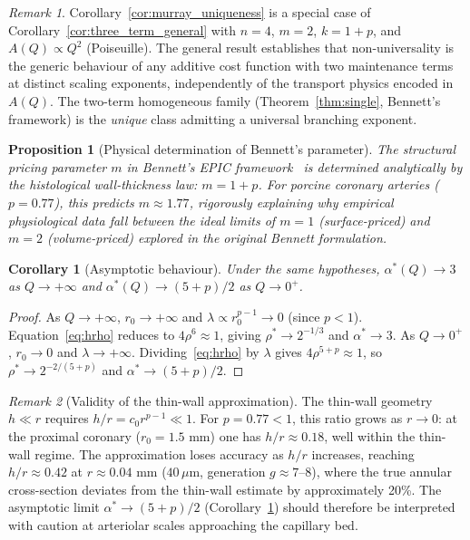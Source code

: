 \documentclass[11pt,a4paper]{article}
\newtheorem{corollary}[theorem]{Corollary}
\newtheorem{proposition}[theorem]{Proposition}
\theoremstyle{remark}
\newtheorem{remark}{Remark}
\begin{document}
\begin{remark}
Corollary~\ref{cor:murray_uniqueness} is a special case of
Corollary~\ref{cor:three_term_general} with $n=4$, $m=2$, $k=1+p$,
and $A(Q) \propto Q^2$ (Poiseuille). The general result establishes
that non-universality is the generic behaviour of any additive cost
function with two maintenance terms at distinct scaling exponents,
independently of the transport physics encoded in $A(Q)$. The
two-term homogeneous family (Theorem~\ref{thm:single}, Bennett's
framework) is the \emph{unique} class admitting a universal
branching exponent.
\end{remark}

\begin{proposition}[Physical determination of Bennett's parameter]
\label{prop:bennett}
The structural pricing parameter $m$ in Bennett's EPIC
framework~\cite{bennett2025} is determined analytically by the histological
wall-thickness law: $m = 1+p$. For porcine coronary arteries ($p=0.77$), this
predicts $m \approx 1.77$, rigorously explaining why empirical physiological
data fall between the ideal limits of $m=1$ (surface-priced) and $m=2$
(volume-priced) explored in the original Bennett formulation.
\end{proposition}

\begin{corollary}[Asymptotic behaviour]
\label{cor:asymp}
Under the same hypotheses, $\alpha^*(Q)\to 3$ as $Q\to+\infty$ and
$\alpha^*(Q)\to(5+p)/2$ as $Q\to 0^+$.
\end{corollary}

\begin{proof}
As $Q\to+\infty$, $r_0\to+\infty$ and $\lambda\propto r_0^{p-1}\to0$ (since
$p<1$).
Equation~\eqref{eq:hrho} reduces to $4\rho^6\approx1$, giving
$\rho^*\to2^{-1/3}$
and $\alpha^*\to3$.
As $Q\to0^+$, $r_0\to0$ and $\lambda\to+\infty$.
Dividing~\eqref{eq:hrho} by $\lambda$ gives $4\rho^{5+p}\approx1$,
so $\rho^*\to2^{-2/(5+p)}$ and $\alpha^*\to(5+p)/2$.
\end{proof}

\begin{remark}[Validity of the thin-wall approximation]
The thin-wall geometry $h \ll r$ requires $h/r = c_0 r^{p-1} \ll 1$.
For $p = 0.77 < 1$, this ratio grows as $r \to 0$: at the proximal
coronary ($r_0 = 1.5$ mm) one has $h/r \approx 0.18$, well within
the thin-wall regime. The approximation loses accuracy as $h/r$
increases, reaching $h/r \approx 0.42$ at $r \approx 0.04$ mm
($40\,\mu$m, generation $g \approx 7$--$8$), where the true annular
cross-section deviates from the thin-wall estimate by approximately
20\%. The asymptotic limit $\alpha^* \to (5+p)/2$ (Corollary~\ref{cor:asymp})
should therefore be interpreted with caution at arteriolar scales
approaching the capillary bed.
\end{remark}
\end{document}
